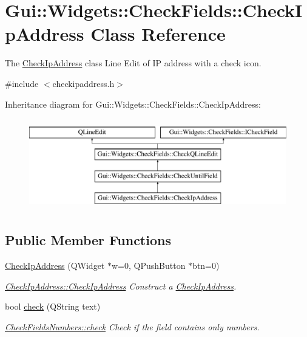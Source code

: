 \hypertarget{classGui_1_1Widgets_1_1CheckFields_1_1CheckIpAddress}{\section{Gui\-:\-:Widgets\-:\-:Check\-Fields\-:\-:Check\-Ip\-Address Class Reference}
\label{classGui_1_1Widgets_1_1CheckFields_1_1CheckIpAddress}
}


The \hyperlink{classGui_1_1Widgets_1_1CheckFields_1_1CheckIpAddress}{Check\-Ip\-Address} class Line Edit of I\-P address with a check icon.  




{\ttfamily \#include $<$checkipaddress.\-h$>$}

Inheritance diagram for Gui\-:\-:Widgets\-:\-:Check\-Fields\-:\-:Check\-Ip\-Address\-:\begin{figure}[H]
\begin{center}
\leavevmode
\includegraphics[height=4.000000cm]{db/d70/classGui_1_1Widgets_1_1CheckFields_1_1CheckIpAddress}
\end{center}
\end{figure}
\subsection*{Public Member Functions}
\begin{DoxyCompactItemize}
\item 
\hyperlink{classGui_1_1Widgets_1_1CheckFields_1_1CheckIpAddress_a0ea8ece5cd108b1ac372e4753a36377e}{Check\-Ip\-Address} (Q\-Widget $\ast$w=0, Q\-Push\-Button $\ast$btn=0)
\begin{DoxyCompactList}\small\item\em \hyperlink{classGui_1_1Widgets_1_1CheckFields_1_1CheckIpAddress_a0ea8ece5cd108b1ac372e4753a36377e}{Check\-Ip\-Address\-::\-Check\-Ip\-Address} Construct a \hyperlink{classGui_1_1Widgets_1_1CheckFields_1_1CheckIpAddress}{Check\-Ip\-Address}. \end{DoxyCompactList}\item 
bool \hyperlink{classGui_1_1Widgets_1_1CheckFields_1_1CheckIpAddress_a785f3ccf0fba4db3e83bfaaaea37455e}{check} (Q\-String text)
\begin{DoxyCompactList}\small\item\em \hyperlink{classGui_1_1Widgets_1_1CheckFields_1_1CheckFieldsNumbers_ade88f674fc2cbbeb514cdf81c0f63487}{Check\-Fields\-Numbers\-::check} Check if the field contains only numbers. \end{DoxyCompactList}\end{DoxyCompactItemize}
